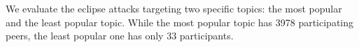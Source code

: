 We evaluate the eclipse attacks targeting two specific topics: the most popular and the least popular topic. While the most popular topic has 3978 participating peers, the least popular one has only 33 participants.


%

